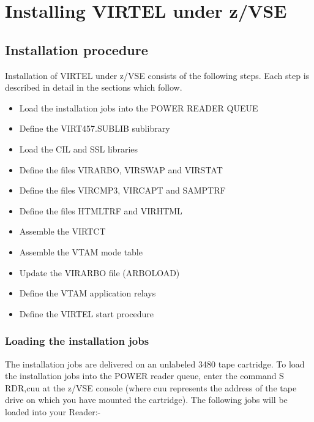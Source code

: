 \documentclass[letterpaper,10pt,english]{sphinxmanual}
\begin{document}
\chapter{Installing VIRTEL under z/VSE}
\label{\detokenize{Installation_Guide:installing-virtel-under-z-vse}}

\section{Installation procedure}
\label{\detokenize{Installation_Guide:id1}}
Installation of VIRTEL under z/VSE consists of the following steps. Each step is described in detail in the sections which follow.
\begin{itemize}
\item {} 
Load the installation jobs into the POWER READER QUEUE

\item {} 
Define the VIRT457.SUBLIB sublibrary

\item {} 
Load the CIL and SSL libraries

\item {} 
Define the files VIRARBO, VIRSWAP and VIRSTAT

\item {} 
Define the files VIRCMP3, VIRCAPT and SAMPTRF

\item {} 
Define the files HTMLTRF and VIRHTML

\item {} 
Assemble the VIRTCT

\item {} 
Assemble the VTAM mode table

\item {} 
Update the VIRARBO file (ARBOLOAD)

\item {} 
Define the VTAM application relays

\item {} 
Define the VIRTEL start procedure

\end{itemize}


\subsection{Loading the installation jobs}
\label{\detokenize{Installation_Guide:loading-the-installation-jobs}}
The installation jobs are delivered on an unlabeled 3480 tape cartridge. To load the installation jobs into the POWER reader queue, enter the command S RDR,cuu at the z/VSE console (where cuu represents the address of the tape drive on which you have mounted the cartridge). The following jobs will be loaded into your Reader:-
\end{document}
